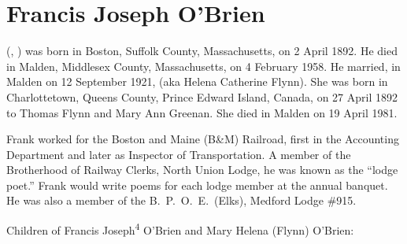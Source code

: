 \section{Francis Joseph O'Brien}

 (, ) was born in Boston, Suffolk County, Massachusetts, on 2 April 1892.\cite{Francis4OBrienBirth} He died in Malden, Middlesex County, Massachusetts, on 4 February 1958.\cite{Francis4OBrienDeath} He married, in Malden on 12 September 1921,  (aka Helena Catherine Flynn).\cite{Francis4OBrienMarriageCert} She was born in Charlottetown, Queens County, Prince Edward Island, Canada, on 27 April 1892 to Thomas Flynn and Mary Ann Greenan.\cite{MaryFlynnBirth} She died in Malden on 19 April 1981.\cite{MaryFlynnDeath}

Frank worked for the Boston and Maine (B\&M) Railroad, first in the Accounting Department\cite{Francis4OBrienAccounting} and later as Inspector of Transportation.\cite{Francis4OBrienInspector} A member of the Brotherhood of Railway Clerks, North Union Lodge, he was known as the ``lodge poet.'' Frank would write poems for each lodge member at the annual banquet.\cite{Francis4OBrienPoet} He was also a member of the B.\ P.\ O.\ E.\ (Elks), Medford Lodge \#915.\cite{Francis4OBrienBPOE}

\begin{KidsIntro}
	Children of Francis Joseph\textsuperscript{4} O'Brien and Mary Helena (Flynn) O'Brien:
\end{KidsIntro}

\begin{Kids}
	
	
	
	
\end{Kids}